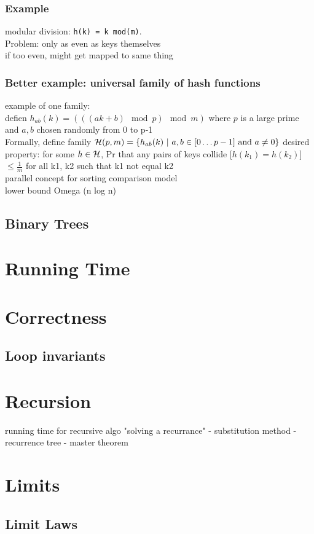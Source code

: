 \documentclass{article}
\begin{document}
\subsubsection{Example}
modular division: \verb|h(k) = k mod(m)|.\\
Problem: only as even as keys themselves\\
if too even, might get mapped to same thing\\
\subsubsection{Better example: universal family of hash functions}
example of one family:\\
defien $h_{ab}(k) = (((ak +b)\mod p)\mod m)$ where $p$ is a large prime and 
$a,b$ chosen randomly from 0 to p-1\\
Formally, define family $\mathcal{H}(p, m) = \{h_{ab}(k) ~|~ a, b \in [0 \dots p-1] \text{ and } a \neq 0 \}$
desired property: for some $h \in \mathcal{H}$, Pr that any pairs of keys collide [$h(k_1)= h(k_2)$] $\leq \frac{1}{m}$ for all k1, k2 such that k1 not equal k2 
\\
parallel concept for sorting comparison model\\
lower bound Omega (n log n)
\subsection{Binary Trees}
\section{Running Time}
\section{Correctness}
\subsection{Loop invariants}
\section{Recursion}
running time for recursive algo
"solving a recurrance"
- substitution method
- recurrence tree
- master theorem
\section{Limits}
\subsection{Limit Laws}
\end{document}
